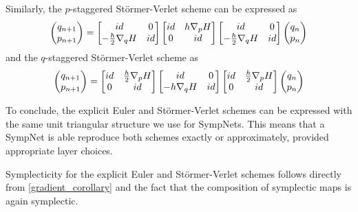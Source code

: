 \documentclass[twoside,a4paper]{article}
\begin{document}
Similarly, the $p$-staggered Störmer-Verlet scheme can be expressed as
\begin{equation*}
	\begin{pmatrix}
		q_{n+1} \\
		p_{n+1}
	\end{pmatrix} =
	\begin{bmatrix}
		id & 0 \\
		-\frac{h}{2} \grad[q]{H} & id
	\end{bmatrix}
	\begin{bmatrix}
		id & h \grad[p]{H} \\
		0 & id
	\end{bmatrix}
	\begin{bmatrix}
		id & 0 \\
		-\frac{h}{2} \grad[q]{H} & id
	\end{bmatrix}
	\begin{pmatrix}
		q_{n} \\
		p_{n}
	\end{pmatrix}
\end{equation*}
and the $q$-staggered Störmer-Verlet scheme as
\begin{equation*}
	\begin{pmatrix}
		q_{n+1} \\
		p_{n+1}
	\end{pmatrix} =
	\begin{bmatrix}
		id & \frac{h}{2} \grad[p]{H} \\
		0 & id
	\end{bmatrix}
	\begin{bmatrix}
		id & 0 \\
		-h \grad[q]{H} & id
	\end{bmatrix}
	\begin{bmatrix}
		id & \frac{h}{2} \grad[p]{H} \\
		0 & id
	\end{bmatrix}
	\begin{pmatrix}
		q_{n} \\
		p_{n}
	\end{pmatrix}
\end{equation*}

To conclude, the explicit Euler and Störmer-Verlet schemes can be expressed with
the same unit triangular structure we use for SympNets. This means that a SympNet is able
reproduce both schemes exactly or approximately, provided appropriate layer choices.

Symplecticity for the explicit Euler and Störmer-Verlet schemes follows directly 
from \cref{gradient_corollary} and the fact that the composition of symplectic maps is again symplectic.
\end{document}
